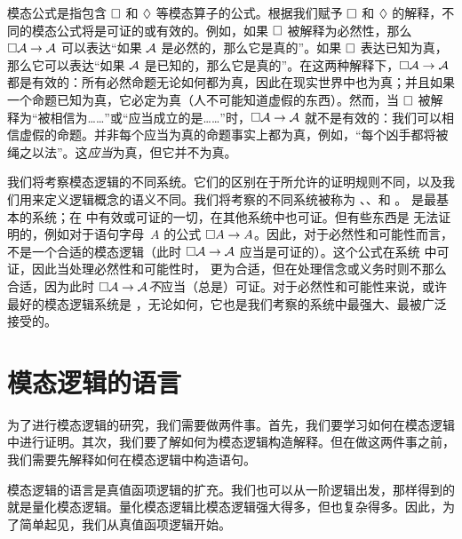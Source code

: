 模态公式是指包含 $\Box$ 和 $\Diamond$ 等模态算子的公式。根据我们赋予 $\Box$ 和 $\Diamond$ 的解释，不同的模态公式将是可证的或有效的。例如，如果 $\Box$ 被解释为必然性，那么 $\Box \mathcal{A} \rightarrow \mathcal{A}$ 可以表达“如果 $\mathcal{A}$ 是必然的，那么它是真的”。如果 $\Box$ 表达已知为真，那么它可以表达“如果 $\mathcal{A}$ 是已知的，那么它是真的”。在这两种解释下，$\Box\mathcal{A} \rightarrow \mathcal{A}$ 都是有效的：所有必然命题无论如何都为真，因此在现实世界中也为真；并且如果一个命题已知为真，它必定为真（人不可能知道虚假的东西）。然而，当 $\Box$ 被解释为“被相信为……”或“应当成立的是……”时，$\Box\mathcal{A} \rightarrow \mathcal{A}$ 就不是有效的：我们可以相信虚假的命题。并非每个应当为真的命题事实上都为真，例如，“每个凶手都将被绳之以法”。这\emph{应当}为真，但它并不为真。

我们将考察模态逻辑的不同系统。它们的区别在于所允许的证明规则不同，以及我们用来定义逻辑概念的语义不同。我们将考察的不同系统被称为 \mlK、\mlT、\mlSfour 和 \mlSfive。\mlK{} 是最基本的系统；在 \mlK{} 中有效或可证的一切，在其他系统中也可证。但有些东西是 \mlK{} 无法证明的，例如对于语句字母~$A$ 的公式 $\Box A \rightarrow A$。因此，对于必然性和可能性而言，\mlK{} 不是一个合适的模态逻辑（此时 $\Box\mathcal{A} \rightarrow \mathcal{A}$ 应当是可证的）。这个公式在系统 \mlT 中可证，因此当处理必然性和可能性时，\mlT{} 更为合适，但在处理信念或义务时则不那么合适，因为此时 $\Box\mathcal{A} \rightarrow \mathcal{A}$\emph{不}应当（总是）可证。对于必然性和可能性来说，或许最好的模态逻辑系统是 \mlSfive，无论如何，它也是我们考察的系统中最强大、最被广泛接受的。

\section{模态逻辑的语言}
\label{TFLtoML}

为了进行模态逻辑的研究，我们需要做两件事。首先，我们要学习如何在模态逻辑中进行证明。其次，我们要了解如何为模态逻辑构造解释。但在做这两件事之前，我们需要先解释如何在模态逻辑中构造语句。

模态逻辑的语言是真值函项逻辑的扩充。我们也可以从一阶逻辑出发，那样得到的就是量化模态逻辑。量化模态逻辑比模态逻辑强大得多，但也复杂得多。因此，为了简单起见，我们从真值函项逻辑开始。

